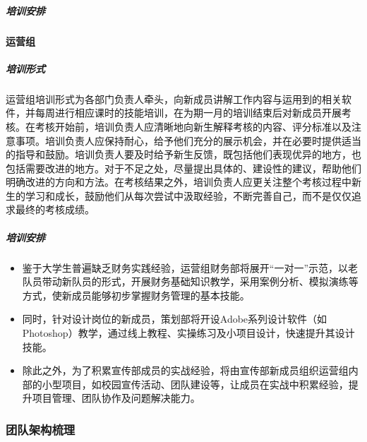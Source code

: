             \subparagraph{培训安排}


        \paragraph{运营组}

            \subparagraph{培训形式}

                运营组培训形式为各部门负责人牵头，向新成员讲解工作内容与运用到的相关软件，并每周进行相应课时的技能培训，在为期一月的培训结束后对新成员开展考核。在考核开始前，培训负责人应清晰地向新生解释考核的内容、评分标准以及注意事项。培训负责人应保持耐心，给予他们充分的展示机会，并在必要时提供适当的指导和鼓励。培训负责人要及时给予新生反馈，既包括他们表现优异的地方，也包括需要改进的地方。对于不足之处，尽量提出具体的、建设性的建议，帮助他们明确改进的方向和方法。在考核结果之外，培训负责人应更关注整个考核过程中新生的学习和成长，鼓励他们从每次尝试中汲取经验，不断完善自己，而不是仅仅追求最终的考核成绩。

            \subparagraph{培训安排}



                \begin{itemize}
                    \item 鉴于大学生普遍缺乏财务实践经验，运营组财务部将展开“一对一”示范，以老队员带动新队员的形式，开展财务基础知识教学，采用案例分析、模拟演练等方式，使新成员能够初步掌握财务管理的基本技能。
                    \item 同时，针对设计岗位的新成员，策划部将开设Adobe系列设计软件（如Photoshop）教学，通过线上教程、实操练习及小项目设计，快速提升其设计技能。
                    \item 除此之外，为了积累宣传部成员的实战经验，将由宣传部新成员组织运营组内部的小型项目，如校园宣传活动、团队建设等，让成员在实战中积累经验，提升项目管理、团队协作及问题解决能力。
                \end{itemize}

    \subsubsection{团队架构梳理}


